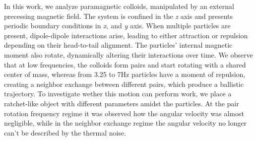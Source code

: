 In this work, we analyze paramagnetic colloids, manipulated by an external precessing magnetic field. The system is confined in the \textit{z} axis and presents periodic boundary conditions in \textit{x}, and \textit{y} axis. When multiple particles are present, dipole-dipole interactions arise, leading to either attraction or repulsion depending on their head-to-tail alignment. The particles' internal magnetic moment also rotate, dynamically altering their interactions over time. We observe that at low frequencies, the colloids form pairs and start rotating with a shared center of mass, whereas from 3.25 to 7Hz particles have a moment of repulsion, creating a neighbor exchange between different pairs, which produce a ballistic trajectory. To investigate wether this motion can perform work, we place a ratchet-like object with different parameters amidst the particles. At the pair rotation frequency regime it was observed how the angular velocity was almost negligible, while in the neighbor exchange regime the angular velocity no longer can't be described by the thermal noise.

\newpage %

\listoffigures
{}

\listoftables
{}

\tableofcontents
\newpage

